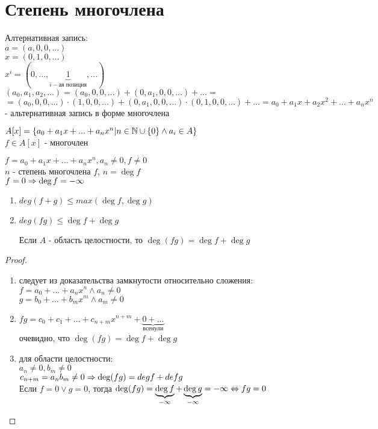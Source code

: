 \section{Степень многочлена}	
	Алтернативная запись:\\
		$ a = (a, 0, 0, ...)$\\		
		$ x = (0, 1, 0, ...)$\\		
		$ x^i = (0, ..., \underbrace{1}_{i-\text{ая позиция}}, ...)$\\
		$ (a_0, a_1, a_2, ...) = (a_0, 0, 0, ...) + (0, a_1, 0, 0, ...) + ... = $\\
		$= (a_0, 0, 0, ...) \cdot (1, 0, 0, ...) + (0, a_1, 0, 0, ...) \cdot (0, 1, 0, 0, ...) + ... = a_0 + a_1x + a_2x^2 + ... + a_nx^n$ - альтернативная запись в форме многочлена\\
	
\begin{Def}
	$ A[x] = \lbrace a_0 + a_1x + ... + a_nx^n | n \in \mathbb{N} \cup \lbrace 0 \rbrace \wedge a_i \in A \rbrace$\\
	$ f \in A[x]$ - многочлен
\end{Def}
	
\begin{Def}
	$ f = a_0 + a_1x + ... + a_nx^n, a_n \neq 0, f \neq 0$	\\
	$n$ - степень многочлена $f$, $n = \deg f$\\
	$f = 0 \Rightarrow \deg f = - \infty$
\end{Def}
	 
\begin{theorem}{}
	\begin{enumerate}
	\item $deg(f + g) \leq max(\deg f, \deg g)$
	\item $deg(fg)  \leq \deg f + \deg g$
	\begin{Rem}
		Если $A$ - область целостности, то $\deg (fg) = \deg f + \deg g$
	\end{Rem}
	\end{enumerate}		
\end{theorem}			 

\begin{proof}
	\begin{enumerate}
	\item следует из доказательства замкнутости относительно сложения:\\
	$f = a_0 + ... + a_nx^n \wedge a_n \neq 0$\\
	$g = b_0 + ... + b_mx^m \wedge a_m \neq 0$
	\item $fg = c_0 + c_1 + ... + c_{n+m}x^{n+m} + \underbrace{0 + ... }_{все нули}$\\
	очевидно, что $\deg (fg) = \deg f + \deg g$\\
	\item для области целостности:\\
	$a_n \neq 0, b_m \neq 0$\\
	$c_{n+m} = a_nb_m \neq 0 \Rightarrow \deg (fg) = deg f + def g$\\
	Если $f = 0 \vee g = 0$, тогда $\deg (fg) = \underbrace{\deg f}_{-\infty} + \underbrace{\deg g}_{-\infty} = -\infty \Leftrightarrow fg = 0$
	\end{enumerate}
\end{proof}	 

